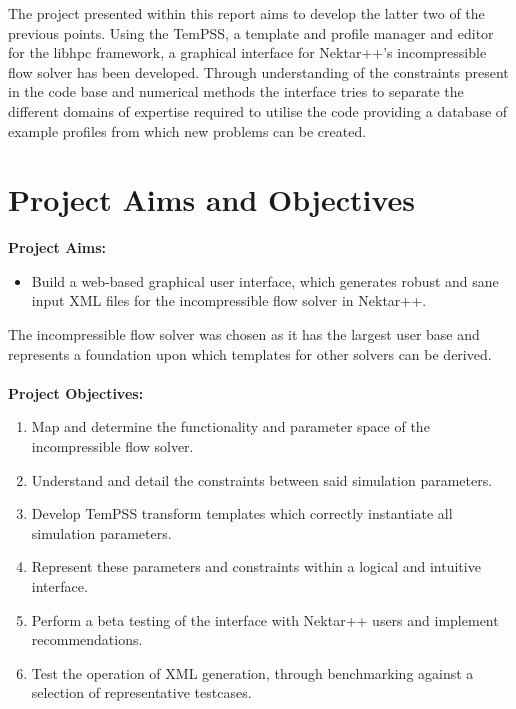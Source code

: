 \documentclass[11pt, a4paper]{report}
\begin{document}
The project presented within this report aims to develop the latter two of the previous points. Using the TemPSS\cite{Austing_etal2017}, a template and profile manager and editor for the libhpc framework, a graphical interface for Nektar++'s incompressible flow solver has been developed. Through understanding of the constraints present in the code base and numerical methods the interface tries to separate the different domains of expertise required to utilise the code providing a database of example profiles from which new problems can be created.
\newpage

\chapter{Project Aims and Objectives}
\label{chap:proj_spec}
\textbf{Project Aims:}
\begin{itemize}
\item Build a web-based graphical user interface, which generates robust and sane input XML files for the incompressible flow solver in Nektar++.
\end{itemize}

The incompressible flow solver was chosen as it has the largest user base and represents a foundation upon which templates for other solvers can be derived.
\\ \vspace{.25cm} \\
\textbf{Project Objectives:}
\begin{enumerate}
\item Map and determine the functionality and parameter space of the incompressible flow solver.
\item Understand and detail the constraints between said simulation parameters.
\item Develop TemPSS transform templates which correctly instantiate all simulation parameters.
\item Represent these parameters and constraints within a logical and intuitive interface.
\item Perform a beta testing of the interface with Nektar++ users and implement recommendations.
\item Test the operation of XML generation, through benchmarking against a selection of representative testcases.
\end{enumerate}
\end{document}
